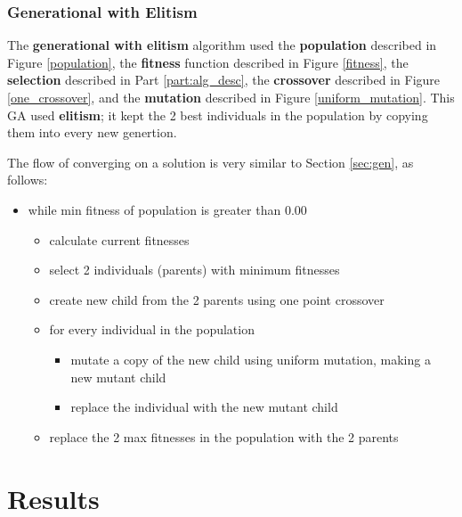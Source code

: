 \documentclass[12pt]{article}
\begin{document}
\section{Generational with Elitism}
The \textbf{generational with elitism} algorithm used the \textbf{population} described in Figure \ref{population}, the \textbf{fitness} function described in Figure \ref{fitness}, the \textbf{selection} described in Part \ref{part:alg_desc}, the \textbf{crossover} described in Figure \ref{one_crossover}, and the \textbf{mutation} described in Figure \ref{uniform_mutation}. This GA used \textbf{elitism}; it kept the 2 best individuals in the population by copying them into every new genertion.

The flow of converging on a solution is very similar to Section \ref{sec:gen}, as follows:
\begin{itemize}
	\item while min fitness of population is greater than 0.00
	\begin{itemize}
		\item calculate current fitnesses
		\item select 2 individuals (parents) with minimum fitnesses
		\item create new child from the 2 parents using one point crossover
		\item for every individual in the population
			\begin{itemize}
				\item mutate a copy of the new child using uniform mutation, making a new mutant child
				\item replace the individual with the new mutant child
			\end{itemize}
		\item replace the 2 max fitnesses in the population with the 2 parents
	\end{itemize}
\end{itemize}


\part*{Results}
\end{document}
